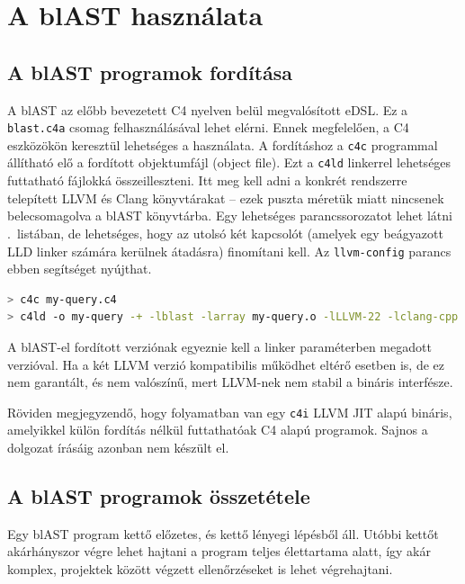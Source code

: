 \section{A blAST használata}

\subsection{A blAST programok fordítása}

A blAST az előbb bevezetett C4 nyelven belül megvalósított \gls{eDSL}.
Ez a {\tt blast.c4a} csomag felhasználásával lehet elérni.
Ennek megfelelően, a C4 eszközökön keresztül lehetséges a használata.
A fordításhoz a {\tt c4c} programmal állítható elő a fordított objektumfájl (object file).
Ezt a {\tt c4ld} linkerrel lehetséges futtatható fájlokká összeilleszteni.
Itt meg kell adni a konkrét rendszerre telepített LLVM és Clang könyvtárakat -- ezek puszta méretük miatt nincsenek belecsomagolva a blAST könyvtárba.
Egy lehetséges parancssorozatot lehet látni .~listában, de lehetséges, hogy az utolsó két kapcsolót (amelyek egy beágyazott LLD linker számára kerülnek átadásra) finomítani kell.
Az {\tt llvm-config} parancs ebben segítséget nyújthat.

\begin{lstlisting}[language=sh,caption={Egy blAST program fordításának lépései},label=lst:blastcc]
> c4c my-query.c4
> c4ld -o my-query -+ -lblast -larray my-query.o -lLLVM-22 -lclang-cpp
\end{lstlisting}

A blAST-el fordított verziónak egyeznie kell a linker paraméterben megadott verzióval.
Ha a két LLVM verzió kompatibilis működhet eltérő esetben is, de ez nem garantált, és nem valószínű, mert LLVM-nek nem stabil a bináris interfésze.

Röviden megjegyzendő, hogy folyamatban van egy {\tt c4i} LLVM \gls{JIT} alapú bináris, amelyikkel külön fordítás nélkül futtathatóak C4 alapú programok.
Sajnos a dolgozat írásáig azonban nem készült el.

\subsection{A blAST programok összetétele}

Egy blAST program kettő előzetes, és kettő lényegi lépésből áll.
Utóbbi kettőt akárhányszor végre lehet hajtani a program teljes élettartama alatt, így akár komplex, projektek között végzett ellenőrzéseket is lehet végrehajtani.

